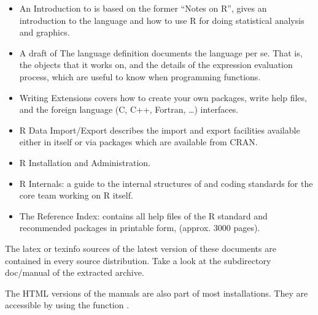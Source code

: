 \begin{footnotesize}
  \begin{itemize}

    \item An Introduction to \RR{} is based on the former ``Notes on R'', gives an
      introduction to the language and how to use R for doing statistical analysis
      and graphics. \\

    \item A draft of The \RR{} language definition documents the language per se.
      That is, the objects that it works on, and the details of the expression 
      evaluation process, which are useful to know when programming \RR{} functions.\\

    \item Writing \RR{} Extensions covers how to create your own packages, write \RR{}
      help files, and the foreign language (C, C++, Fortran, \ldots) interfaces.\\

    \item R Data Import/Export describes the import and export facilities
      available either in \RR{} itself or via packages which are available from CRAN.\\

    \item R Installation and Administration.\\

    \item R Internals: a guide to the internal structures of \RR{} and coding
      standards for the core team working on R itself.\\

    \item The \RR{} Reference Index: contains all help files of the R standard and
      recommended packages in printable form, (approx. 3000 pages).\\

  \end{itemize}
\end{footnotesize}


The latex or texinfo sources of the latest version of these documents are contained
in every \RR{} source distribution. Take a look at the subdirectory doc/manual of the
extracted archive.


The HTML versions of the manuals are also part of most \RR{} installations. They are
accessible by using the function .
